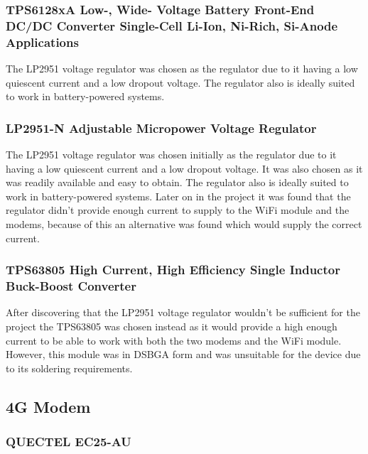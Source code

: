 \subsubsection{TPS6128xA Low-, Wide- Voltage Battery Front-End DC/DC Converter Single-Cell Li-Ion, Ni-Rich, Si-Anode Applications}

The LP2951 voltage regulator was chosen as the regulator due to it having a low quiescent current and a low dropout voltage. The regulator also is ideally suited to work in battery-powered systems. 

\subsubsection{LP2951-N Adjustable Micropower Voltage Regulator}

The LP2951 voltage regulator was chosen initially as the regulator due to it having a low quiescent current and a low dropout voltage. It was also chosen as it was readily available and easy to obtain. The regulator also is ideally suited to work in battery-powered systems. Later on in the project it was found that the regulator didn't provide enough current to supply to the WiFi module and the modems, because of this an alternative was found which would supply the correct current.


\subsubsection{TPS63805 High Current, High Efficiency Single Inductor Buck-Boost Converter}

After discovering that the LP2951 voltage regulator wouldn't be sufficient for the project the TPS63805 was chosen instead as it would provide a high enough current to be able to work with both the two modems and the WiFi module. However, this module was in DSBGA form and was unsuitable for the device due to its soldering requirements. 



\subsection{4G Modem}
\subsubsection{ QUECTEL EC25-AU}

